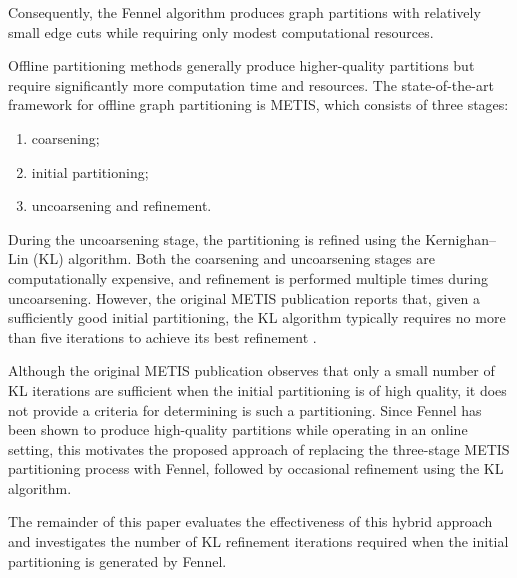 Consequently, the Fennel algorithm produces graph partitions with relatively small edge cuts while requiring only modest computational resources.

Offline partitioning methods generally produce higher-quality partitions but require significantly more computation time and resources. The state-of-the-art framework for offline graph partitioning is METIS, which consists of three stages:

\begin{enumerate}
    \item coarsening;
    \item initial partitioning;
    \item uncoarsening and refinement.
\end{enumerate}

During the uncoarsening stage, the partitioning is refined using the Kernighan--Lin (KL) algorithm. Both the coarsening and uncoarsening stages are computationally expensive, and refinement is performed multiple times during uncoarsening. However, the original METIS publication reports that, given a sufficiently good initial partitioning, the KL algorithm typically requires no more than five iterations to achieve its best refinement \cite{MetisOG}.

Although the original METIS publication observes that only a small number of KL iterations are sufficient when the initial partitioning is of high quality, it does not provide a criteria for determining is such a partitioning. Since Fennel has been shown to produce high-quality partitions while operating in an online setting, this motivates the proposed approach of replacing the three-stage METIS partitioning process with Fennel, followed by occasional refinement using the KL algorithm.

The remainder of this paper evaluates the effectiveness of this hybrid approach and investigates the number of KL refinement iterations required when the initial partitioning is generated by Fennel.
